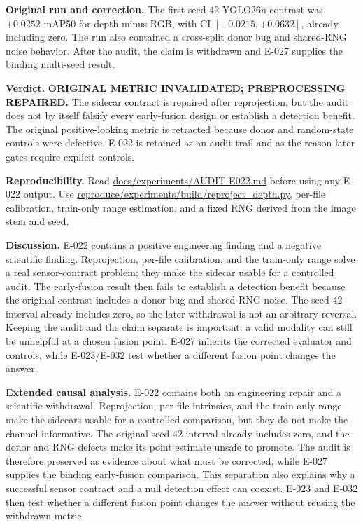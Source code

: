 \documentclass[preprint,12pt]{elsarticle}
\newcommand{\pathcode}[1]{\scriptsize\url{#1}}
\begin{document}
\textbf{Original run and correction.} The first seed-42 YOLO26n contrast was
\(+0.0252\) mAP50 for depth minus RGB, with CI
\([-0.0215,+0.0632]\), already including zero. The run also contained a
cross-split donor bug and shared-RNG noise behavior. After the audit, the
claim is withdrawn and E-027 supplies the binding multi-seed result.

\textbf{Verdict.} \textbf{ORIGINAL METRIC INVALIDATED; PREPROCESSING
REPAIRED.} The sidecar contract is repaired after reprojection, but the audit
does not by itself falsify every early-fusion design or establish a detection
benefit. The original positive-looking metric is retracted because donor and
random-state controls were defective. E-022 is retained as an audit trail and
as the reason later gates require explicit controls.

\textbf{Reproducibility.} Read \pathcode{docs/experiments/AUDIT-E022.md}
before using any E-022 output. Use \pathcode{reproduce/experiments/build/reproject_depth.py},
per-file calibration, train-only range estimation, and a fixed RNG derived
from the image stem and seed.

\textbf{Discussion.} E-022 contains a positive engineering finding and a
negative scientific finding. Reprojection, per-file calibration, and the
train-only range solve a real sensor-contract problem; they make the sidecar
usable for a controlled audit. The early-fusion result then fails to establish
a detection benefit because the original contrast includes a donor bug and
shared-RNG noise. The seed-42 interval already includes zero, so the later
withdrawal is not an arbitrary reversal. Keeping the audit and the claim
separate is important: a valid modality can still be unhelpful at a chosen
fusion point. E-027 inherits the corrected evaluator and controls, while
E-023/E-032 test whether a different fusion point changes the answer.

\textbf{Extended causal analysis.} E-022 contains both an engineering repair
and a scientific withdrawal. Reprojection, per-file intrinsics, and the
train-only range make the sidecars usable for a controlled comparison, but
they do not make the channel informative. The original seed-42 interval
already includes zero, and the donor and RNG defects make its point estimate
unsafe to promote. The audit is therefore preserved as evidence about what
must be corrected, while E-027 supplies the binding early-fusion comparison.
This separation also explains why a successful sensor contract and a null
detection effect can coexist. E-023 and E-032 then test whether a different
fusion point changes the answer without reusing the withdrawn metric.
\end{document}
